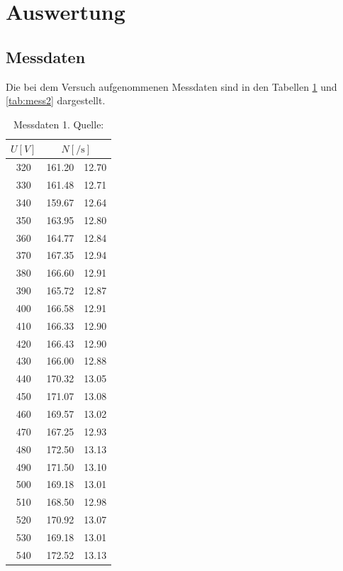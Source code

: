 \section{Auswertung}
\label{sec:Auswertung}
\subsection{Messdaten}
\label{subsec:messdaten}
Die bei dem Versuch aufgenommenen Messdaten sind in den Tabellen \ref{tab:mess1} und \ref{tab:mess2}
dargestellt.
\begin{table}[H]
    \centering
        \caption{Messdaten 1. Quelle:\cite{AP02}}
        \label{tab:mess1}
        \begin{tabular}{c c @{${}\pm{}$} c}
          \toprule
          {$U [\si{V}]$} & \multicolumn{2}{c}{$N [\si{\per\second}]$} \\
          \midrule
          320 &  161.20 &  12.70\\
          330 &  161.48 &  12.71\\
          340 &  159.67 &  12.64\\
          350 &  163.95 &  12.80\\
          360 &  164.77 &  12.84\\
          370 &  167.35 &  12.94\\
          380 &  166.60 &  12.91\\
          390 &  165.72 &  12.87\\
          400 &  166.58 &  12.91\\
          410 &  166.33 &  12.90\\
          420 &  166.43 &  12.90\\
          430 &  166.00 &  12.88\\
          440 &  170.32 &  13.05\\
          450 &  171.07 &  13.08\\
          460 &  169.57 &  13.02\\
          470 &  167.25 &  12.93\\
          480 &  172.50 &  13.13\\
          490 &  171.50 &  13.10\\
          500 &  169.18 &  13.01\\
          510 &  168.50 &  12.98\\
          520 &  170.92 &  13.07\\
          530 &  169.18 &  13.01\\
          540 &  172.52 &  13.13\\

\end{tabular}
\end{table}
